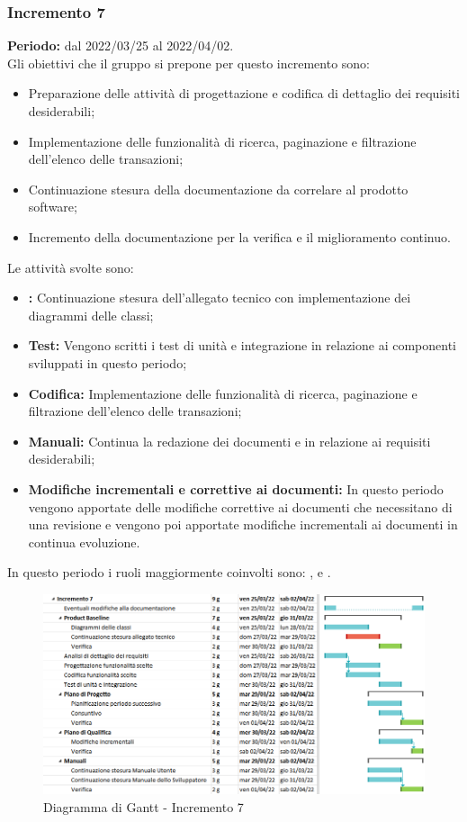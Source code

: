 \subsubsection{Incremento 7} \label{subsubsection:incremento_7}
\textbf{Periodo:} dal 2022/03/25 al 2022/04/02.
\bigskip
\\Gli obiettivi che il gruppo si prepone per questo incremento sono:
\begin{itemize}
  \item Preparazione delle attività di progettazione e codifica di dettaglio dei requisiti desiderabili;
  \item Implementazione delle funzionalità di ricerca, paginazione e filtrazione dell'elenco delle transazioni;
  \item Continuazione stesura della documentazione da correlare al prodotto software;
  \item Incremento della documentazione per la verifica e il miglioramento continuo.
\end{itemize}
Le attività svolte sono:
\begin{itemize}
  \item \textbf{\PB{}:} Continuazione stesura dell’allegato tecnico con implementazione dei diagrammi delle classi;
  \item \textbf{Test:} Vengono scritti i test di unità e integrazione in relazione ai componenti sviluppati in questo periodo;
  \item \textbf{Codifica:} Implementazione delle funzionalità di ricerca, paginazione e filtrazione dell'elenco delle transazioni;
  \item \textbf{Manuali:} Continua la redazione dei documenti \docNameVersionMU{} e \docNameVersionMS{} in relazione ai requisiti desiderabili;
  \item \textbf{Modifiche incrementali e correttive ai documenti:} In questo periodo vengono apportate delle modifiche correttive ai documenti che necessitano di una revisione e vengono poi apportate modifiche incrementali ai documenti in continua evoluzione.
\end{itemize}
In questo periodo i ruoli maggiormente coinvolti sono: \roleDesignerLow{}, \roleProgrammerLow{} e \roleVerifierLow{}.
\begin{figure}[H]
  \centering
  \includegraphics[scale=0.52]{immagini/incremento_7.png}
  \caption{Diagramma di Gantt - Incremento 7}
\end{figure}

